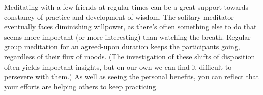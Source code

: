 
Meditating with a few friends at regular times can be a great support
towards constancy of practice and development of wisdom. The solitary
meditator eventually faces diminishing willpower, as there's often
something else to do that seems more important (or more interesting)
than watching the breath. Regular group meditation for an agreed-upon
duration keeps the participants going, regardless of their flux of
moods. (The investigation of these shifts of disposition often yields
important insights, but on our own we can find it difficult to persevere
with them.) As well as seeing the personal benefits, you can reflect
that your efforts are helping others to keep practicing.
